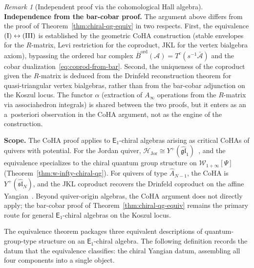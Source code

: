 \documentclass[11pt,reqno]{amsart}
\theoremstyle{definition}
\theoremstyle{remark}
\newtheorem{remark}[theorem]{Remark}
\newcommand{\cA}{\mathcal{A}}
\newcommand{\cH}{\mathcal{H}}
\newcommand{\cW}{\mathcal{W}}
\newcommand{\Ainf}{A_{\infty}}
\newcommand{\Eone}{\mathsf{E}_{1}}
\newcommand{\Barord}{\overline{B}^{\mathrm{ord}}}
\numberwithin{equation}{section}
\begin{document}
\begin{remark}[Independent proof via the cohomological Hall algebra]
\smallskip
\noindent\textbf{Independence from the bar-cobar proof.}
The argument above differs from the proof of
Theorem~\ref{thm:chiral-qg-equiv} in two respects.
First, the equivalence $\textup{(I)} \leftrightarrow
\textup{(III)}$ is established by the geometric CoHA
construction (stable envelopes for the $R$-matrix,
Levi restriction for the coproduct, JKL for the vertex
bialgebra axiom), bypassing the ordered bar complex
$\Barord(\cA) = T^c(s^{-1}\bar{\cA})$ and the
cobar dualization~\eqref{eq:coprod-from-bar}. Second, the
uniqueness of the coproduct given the $R$-matrix is
deduced from the Drinfeld reconstruction theorem for
quasi-triangular vertex bialgebras, rather than from the
bar-cobar adjunction on the Koszul locus. The functor
$\alpha$ (extraction of $\Ainf$ operations from the
$R$-matrix via associahedron integrals) is shared between
the two proofs, but it enters as an a~posteriori observation
in the CoHA argument, not as the engine of the
construction.

\smallskip
\noindent\textbf{Scope.}
The CoHA proof applies to $\Eone$-chiral algebras
arising as critical CoHAs of quivers with potential.
For the Jordan quiver, $\cH_{\mathrm{Jor}} \cong
Y^+(\widehat{\mathfrak{gl}}_1)$~\cite{SV13}, and the
equivalence specializes to the chiral quantum group
structure on $\cW_{1+\infty}[\Psi]$
(Theorem~\ref{thm:w-infty-chiral-qg}).
For quivers of type $\widehat{A}_{N-1}$, the CoHA
is $Y^+(\widehat{\mathfrak{sl}}_N)$, and the JKL
coproduct recovers the Drinfeld coproduct on the affine
Yangian~\cite{JKL26}. Beyond quiver-origin algebras, the
CoHA argument does not directly apply; the bar-cobar proof
of Theorem~\ref{thm:chiral-qg-equiv} remains the primary
route for general $\Eone$-chiral algebras on the Koszul
locus.
\end{remark}

The equivalence theorem packages three equivalent descriptions
of quantum-group-type structure on an $\Eone$-chiral algebra.
The following definition records the datum that the equivalence
classifies: the chiral Yangian datum, assembling all four
components into a single object.
\end{document}

